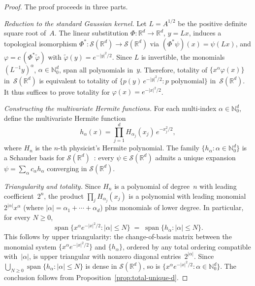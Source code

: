 \documentclass[12pt]{article}
\theoremstyle{definition}
\newcommand{\R}{\mathbb{R}}
\newcommand{\N}{\mathbb{N}}
\begin{document}
\begin{proof}
The proof proceeds in three parts.

\emph{Reduction to the standard Gaussian kernel.}
Let $L = A^{1/2}$ be the positive definite square root of~$A$.  The linear
substitution $\Phi:\R^d\to\R^d$, $y = Lx$, induces a topological
isomorphism $\Phi^*:\mathcal{S}(\R^d)\to\mathcal{S}(\R^d)$ via
$(\Phi^*\psi)(x) = \psi(Lx)$, and $\varphi = c\,(\Phi^*\tilde\varphi)$ with
$\tilde\varphi(y) = e^{-|y|^2/2}$.  Since $L$ is invertible, the monomials
$(L^{-1}y)^\alpha$, $\alpha\in\N_0^d$, span all polynomials in~$y$.
Therefore, totality of $\{x^\alpha\varphi(x)\}$ in~$\mathcal{S}(\R^d)$
is equivalent to totality of
$\{p(y)\,e^{-|y|^2/2}: p\text{ polynomial}\}$ in~$\mathcal{S}(\R^d)$.
It thus suffices to prove totality for $\varphi(x)=e^{-|x|^2/2}$.

\emph{Constructing the multivariate Hermite functions.}
For each multi-index $\alpha\in\N_0^d$, define the multivariate Hermite
function
\[
h_\alpha(x)
=
\prod_{j=1}^{d} H_{\alpha_j}(x_j)\,e^{-x_j^2/2},
\]
where $H_n$ is the $n$-th physicist's Hermite polynomial.  The family
$\{h_\alpha:\alpha\in\N_0^d\}$ is a Schauder basis for
$\mathcal{S}(\R^d)$~\cite{reed-simon1980}: every
$\psi\in\mathcal{S}(\R^d)$ admits a unique expansion $\psi =
\sum_\alpha c_\alpha h_\alpha$ converging in $\mathcal{S}(\R^d)$.

\emph{Triangularity and totality.}
Since $H_n$ is a polynomial of degree~$n$ with leading coefficient~$2^n$,
the product $\prod_j H_{\alpha_j}(x_j)$ is a polynomial with leading
monomial $2^{|\alpha|}x^\alpha$ (where $|\alpha|=\alpha_1+\cdots+\alpha_d$)
plus monomials of lower degree.  In particular, for every $N\ge 0$,
\begin{equation}\label{eq:hermite-span-d}
\operatorname{span}\{x^\alpha e^{-|x|^2/2}:|\alpha|\le N\}
\;=\;
\operatorname{span}\{h_\alpha:|\alpha|\le N\}.
\end{equation}
This follows by upper triangularity: the change-of-basis matrix between the
monomial system $\{x^\alpha e^{-|x|^2/2}\}$ and $\{h_\alpha\}$, ordered by
any total ordering compatible with~$|\alpha|$, is upper triangular with
nonzero diagonal entries~$2^{|\alpha|}$.  Since
$\bigcup_{N\ge 0}\operatorname{span}\{h_\alpha:|\alpha|\le N\}$ is dense in
$\mathcal{S}(\R^d)$, so is
$\{x^\alpha e^{-|x|^2/2}:\alpha\in\N_0^d\}$.
The conclusion follows from Proposition~\ref{prop:total-unique-d}.
\end{proof}
\end{document}
